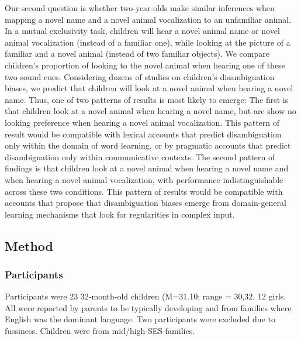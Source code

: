 \documentclass[english,floatsintext,man]{apa6}
\theoremstyle{definition}
\theoremstyle{definition}
\theoremstyle{definition}
\theoremstyle{remark}
\begin{document}
Our second question is whether two-year-olds make similar inferences
when mapping a novel name and a novel animal vocalization to an
unfamiliar animal. In a mutual exclusivity task, children will hear a
novel animal name or novel animal vocalization (instead of a familiar
one), while looking at the picture of a familiar and a novel animal
(instead of two familiar objects). We compare children's proportion of
looking to the novel animal when hearing one of these two sound cues.
Considering dozens of studies on children's disambiguation biases, we
predict that children will look at a novel animal when hearing a novel
name. Thus, one of two patterns of results is most likely to emerge: The
first is that children look at a novel animal when hearing a novel name,
but are show no looking preference when hearing a novel animal
vocalization. This pattern of result would be compatible with lexical
accounts that predict disambiguation only within the domain of word
learning, or by pragmatic accounts that predict disambiguation only
within communicative contexts. The second pattern of findings is that
children look at a novel animal when hearing a novel name and when
hearing a novel animal vocalization, with performance indistinguishable
across these two conditions. This pattern of results would be compatible
with accounts that propose that disambiguation biases emerge from
domain-general learning mechanisms that look for regularities in complex
input.

\hypertarget{method}{%
\subsection{Method}\label{method}}

\hypertarget{participants}{%
\subsubsection{Participants}\label{participants}}

Participants were 23 32-month-old children (M=31.10; range = 30,32, 12
girls. All were reported by parents to be typically developing and from
families where English was the dominant language. Two participants were
excluded due to fussiness. Children were from mid/high-SES families.
\end{document}
